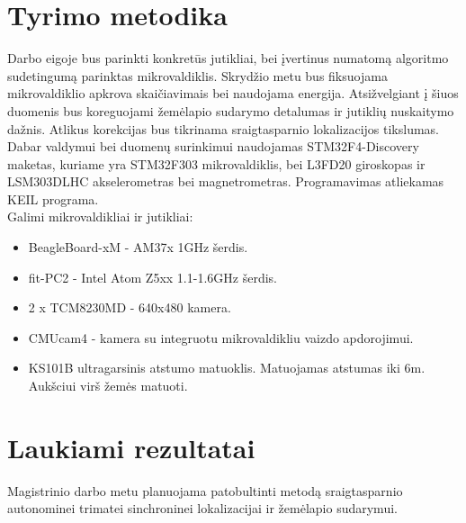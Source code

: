 \documentclass[a4paper, 12pt]{article} %
\begin{document}
\begin{onehalfspacing}
\section{Tyrimo metodika}
Darbo eigoje bus parinkti konkret\=us jutikliai, bei \k{i}vertinus numatom\k{a} algoritmo sudetingum\k{a} parinktas mikrovaldiklis. Skryd\v{z}io metu bus fiksuojama mikrovaldiklio apkrova skai\v{c}iavimais bei naudojama energija. Atsi\v{z}velgiant \k{i} \v{s}iuos duomenis bus koreguojami \v{z}em\.elapio sudarymo detalumas ir jutikli\k{u} nuskaitymo da\v{z}nis. Atlikus korekcijas bus tikrinama sraigtasparnio lokalizacijos tikslumas.
\\
\indent Dabar valdymui bei duomen\k{u} surinkimui naudojamas STM32F4-Discovery maketas, kuriame yra STM32F303 mikrovaldiklis, bei  L3FD20 giroskopas ir LSM303DLHC akselerometras bei magnetrometras. Programavimas atliekamas KEIL programa. 
\\
Galimi mikrovaldikliai ir jutikliai:
\begin{itemize}
\item BeagleBoard-xM - AM37x 1GHz \v{s}erdis.
\item fit-PC2 - Intel Atom Z5xx 1.1-1.6GHz \v{s}erdis.
\item 2 x TCM8230MD - 640x480 kamera.
\item CMUcam4 - kamera su integruotu mikrovaldikliu vaizdo apdorojimui.
\item KS101B ultragarsinis atstumo matuoklis. Matuojamas atstumas iki 6m. Auk\v{sc}iui vir\v{s} \v{z}em\.es matuoti.


\end{itemize} 

\section{Laukiami rezultatai}

Magistrinio darbo metu planuojama patobultinti metod\k{a} sraigtasparnio autonominei trimatei sinchroninei lokalizacijai ir \v{z}em\.elapio sudarymui. 


\end{onehalfspacing}

\newpage




\end{document}
